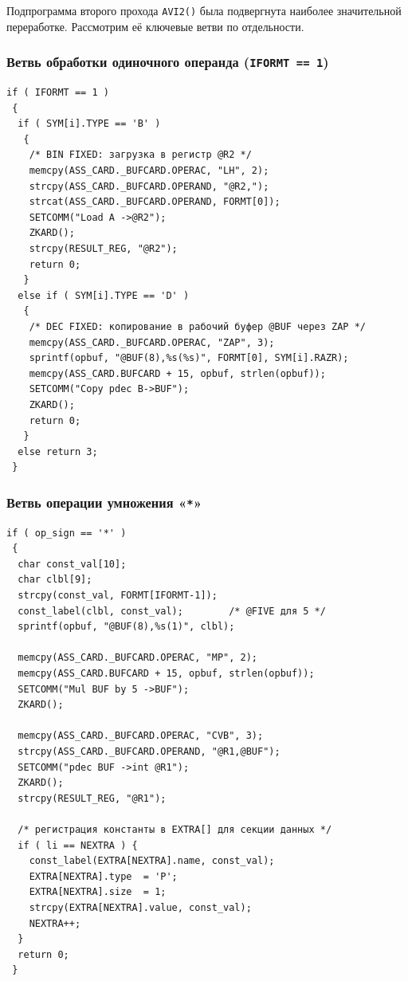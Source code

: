 \documentclass[a4paper,14pt]{extarticle}
\begin{document}
Подпрограмма второго прохода \texttt{AVI2()} была подвергнута наиболее значительной
переработке. Рассмотрим её ключевые ветви по отдельности.

\subsubsection*{Ветвь обработки одиночного операнда (\texttt{IFORMT == 1})}

\begin{lstlisting}[style=Cstyle,caption={Ветвь \texttt{AVI2()} для одиночного операнда},label=lst:avi2single]
if ( IFORMT == 1 )
 {
  if ( SYM[i].TYPE == 'B' )
   {
    /* BIN FIXED: загрузка в регистр @R2 */
    memcpy(ASS_CARD._BUFCARD.OPERAC, "LH", 2);
    strcpy(ASS_CARD._BUFCARD.OPERAND, "@R2,");
    strcat(ASS_CARD._BUFCARD.OPERAND, FORMT[0]);
    SETCOMM("Load A ->@R2");
    ZKARD();
    strcpy(RESULT_REG, "@R2");
    return 0;
   }
  else if ( SYM[i].TYPE == 'D' )
   {
    /* DEC FIXED: копирование в рабочий буфер @BUF через ZAP */
    memcpy(ASS_CARD._BUFCARD.OPERAC, "ZAP", 3);
    sprintf(opbuf, "@BUF(8),%s(%s)", FORMT[0], SYM[i].RAZR);
    memcpy(ASS_CARD.BUFCARD + 15, opbuf, strlen(opbuf));
    SETCOMM("Copy pdec B->BUF");
    ZKARD();
    return 0;
   }
  else return 3;
 }
\end{lstlisting}

\subsubsection*{Ветвь операции умножения «\texttt{*}»}

\begin{lstlisting}[style=Cstyle,caption={Ветвь \texttt{AVI2()} для операции «*»},label=lst:avi2mul]
if ( op_sign == '*' )
 {
  char const_val[10];
  char clbl[9];
  strcpy(const_val, FORMT[IFORMT-1]);
  const_label(clbl, const_val);        /* @FIVE для 5 */
  sprintf(opbuf, "@BUF(8),%s(1)", clbl);

  memcpy(ASS_CARD._BUFCARD.OPERAC, "MP", 2);
  memcpy(ASS_CARD.BUFCARD + 15, opbuf, strlen(opbuf));
  SETCOMM("Mul BUF by 5 ->BUF");
  ZKARD();

  memcpy(ASS_CARD._BUFCARD.OPERAC, "CVB", 3);
  strcpy(ASS_CARD._BUFCARD.OPERAND, "@R1,@BUF");
  SETCOMM("pdec BUF ->int @R1");
  ZKARD();
  strcpy(RESULT_REG, "@R1");

  /* регистрация константы в EXTRA[] для секции данных */
  if ( li == NEXTRA ) {
    const_label(EXTRA[NEXTRA].name, const_val);
    EXTRA[NEXTRA].type  = 'P';
    EXTRA[NEXTRA].size  = 1;
    strcpy(EXTRA[NEXTRA].value, const_val);
    NEXTRA++;
  }
  return 0;
 }
\end{lstlisting}
\end{document}
